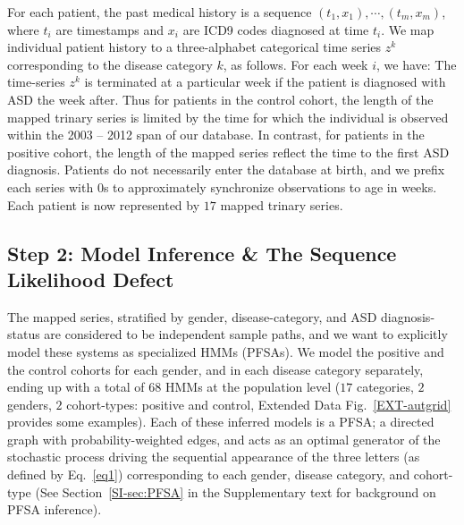 \documentclass[3p,super,numbers,sort&compress,preprint,10pt]{elsarticle}
\def\treatment{positive\xspace}
\begin{document}
For each patient, the past  medical history is a sequence $(t_1,x_1),\cdots,(t_m,x_m)$, where $t_i$ are timestamps and $x_i$ are ICD9 codes diagnosed at time $t_i$.  We map individual patient history to a three-alphabet categorical time series $z^k$ corresponding to the disease category $k$,  as follows. For each week $i$, we have: 
\noindent
                  The time-series $z^k$ is terminated at a particular week if the patient is diagnosed with ASD the week after. Thus for patients in the control cohort, the length of the mapped trinary series is limited by the time for which the individual is observed within the  2003 -- 2012 span of our database. In contrast, for patients in  the \treatment cohort, the length of the mapped series reflect the time to the first ASD diagnosis. Patients do not necessarily enter the database at birth, and we prefix each series with 0s to  approximately synchronize observations to age in weeks. 
Each patient is now represented by $17$ mapped trinary series.

\subsection*{Step 2: Model Inference \& The Sequence Likelihood Defect}
The mapped series, stratified by  gender, disease-category, and ASD diagnosis-status are considered to be independent sample paths, and we want to explicitly model these systems as specialized HMMs (PFSAs). We model the \treatment and the control cohorts for each gender, and in  each disease category separately, ending up with a total of $68$ HMMs at the population level ($17$ categories, $2$ genders, $2$ cohort-types: \treatment and control, Extended Data Fig.~\ref{EXT-autgrid} provides some examples). Each of these inferred models is  a PFSA;  a directed graph with probability-weighted edges, and acts as an optimal generator of the  stochastic process driving the  sequential appearance of the three letters (as defined by Eq.~\eqref{eq1})  corresponding to each gender, disease category, and cohort-type (See Section~\ref{SI-sec:PFSA} in the Supplementary text for  background on PFSA inference). 
\end{document}
